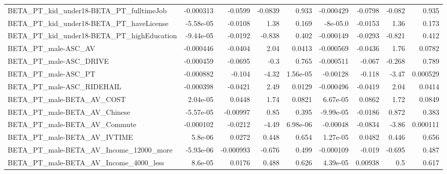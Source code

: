 \begin{tabular}{lrrrrrrrr}
BETA\_PT\_kid\_under18-BETA\_PT\_fulltimeJob            &   -0.000313 &      -0.0599 &  -0.0839 &    0.933 &  -0.000429 &     -0.0798 &       -0.082 &         0.935 \\
BETA\_PT\_kid\_under18-BETA\_PT\_haveLicense            &   -5.58e-05 &      -0.0108 &     1.38 &    0.169 &   -8e-05.0 &     -0.0153 &         1.36 &         0.173 \\
BETA\_PT\_kid\_under18-BETA\_PT\_highEducation          &   -9.44e-05 &      -0.0192 &   -0.838 &    0.402 &  -0.000149 &     -0.0293 &       -0.821 &         0.412 \\
BETA\_PT\_male-ASC\_AV                                &   -0.000446 &      -0.0404 &     2.04 &   0.0413 &  -0.000569 &     -0.0436 &         1.76 &        0.0782 \\
BETA\_PT\_male-ASC\_DRIVE                             &   -0.000459 &      -0.0695 &     -0.3 &    0.765 &  -0.000511 &      -0.067 &       -0.268 &         0.789 \\
BETA\_PT\_male-ASC\_PT                                &   -0.000882 &       -0.104 &    -4.32 & 1.56e-05 &   -0.00128 &      -0.118 &        -3.47 &      0.000529 \\
BETA\_PT\_male-ASC\_RIDEHAIL                          &   -0.000398 &      -0.0421 &     2.49 &   0.0129 &  -0.000496 &     -0.0419 &         2.04 &        0.0414 \\
BETA\_PT\_male-BETA\_AV\_COST                          &    2.04e-05 &       0.0448 &     1.74 &   0.0821 &   6.67e-05 &      0.0862 &         1.72 &        0.0849 \\
BETA\_PT\_male-BETA\_AV\_Chinese                       &   -5.57e-05 &     -0.00997 &     0.85 &    0.395 &  -9.99e-05 &     -0.0186 &        0.872 &         0.383 \\
BETA\_PT\_male-BETA\_AV\_Commute                       &   -0.000102 &      -0.0212 &    -4.49 & 6.98e-06 &   -0.00048 &     -0.0834 &        -3.86 &      0.000111 \\
BETA\_PT\_male-BETA\_AV\_IVTIME                        &     5.8e-06 &       0.0272 &    0.448 &    0.654 &   1.27e-05 &      0.0482 &        0.446 &         0.656 \\
BETA\_PT\_male-BETA\_AV\_Income\_12000\_more             &   -5.93e-06 &    -0.000993 &   -0.676 &    0.499 &  -0.000109 &      -0.019 &       -0.695 &         0.487 \\
BETA\_PT\_male-BETA\_AV\_Income\_4000\_less              &     8.6e-05 &       0.0176 &    0.488 &    0.626 &   4.39e-05 &     0.00938 &          0.5 &         0.617 \\

\end{tabular}
